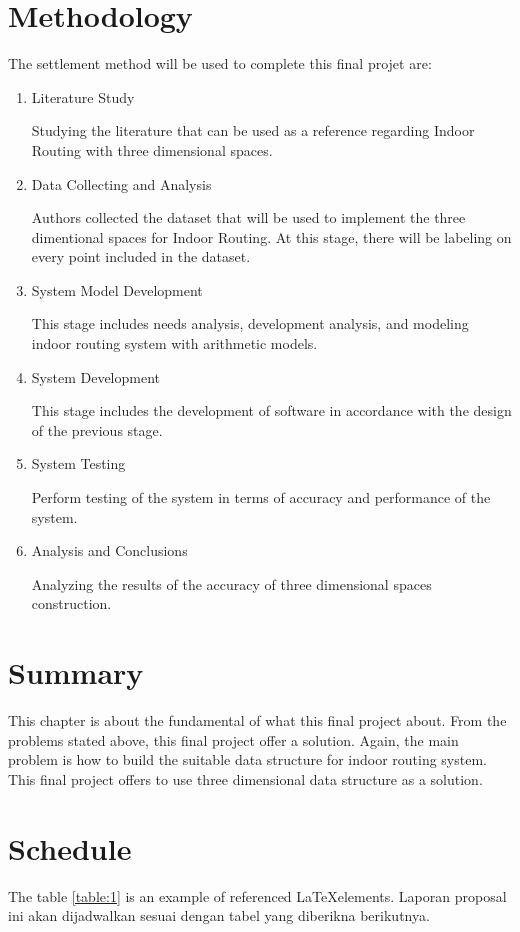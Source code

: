\section{Methodology}
The settlement method will be used to complete this final projet are:
\begin{enumerate}
	\item 
	Literature Study
	
	Studying the literature that can be used as a reference regarding Indoor Routing with three dimensional spaces.
	\item 
	Data Collecting and Analysis
	
	Authors collected the dataset that will be used to implement the three dimentional spaces for Indoor Routing. At this stage, there will be labeling on every point included in the dataset.
	\item 
	System Model Development 
	
	This stage includes needs analysis, development analysis, and modeling indoor routing system with arithmetic models.
	\item 
	System Development
	
	This stage includes the development of software in accordance with the design of the previous stage.
	\item 
	System Testing
	
	Perform testing of the system in terms of accuracy and performance of the system.
	\item 
	Analysis and Conclusions
	
	Analyzing the results of the accuracy of three dimensional spaces construction.
\end{enumerate}

\section{Summary}
This chapter is about the fundamental of what this final project about. From the problems stated above, this final project offer a solution. Again, the main problem is how to build the suitable data structure for indoor routing system. This final project offers to use three dimensional data structure as a solution. 

\iflogTA
\else
\section{Schedule}
The table \ref{table:1} is an example of referenced \LaTeX elements. Laporan proposal ini akan dijadwalkan sesuai dengan tabel yang diberikna berikutnya. 

